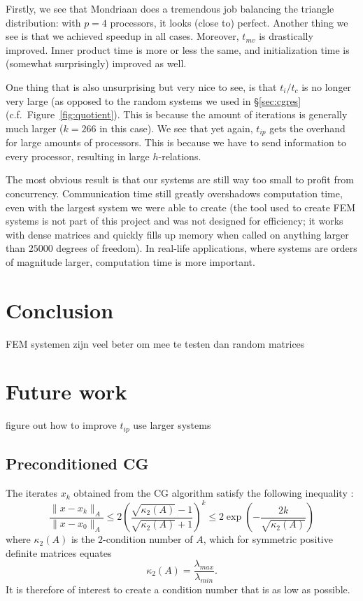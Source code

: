 \documentclass[11pt]{amsart}
\theoremstyle{definition}
\begin{document}
Firstly, we see that Mondriaan does a tremendous job balancing the triangle distribution: with $p=4$ processors, it looks (close to) perfect. Another thing we see is that we achieved speedup in all cases. Moreover, $t_{mv}$ is drastically improved. Inner product time is more or less the same, and initialization time is (somewhat surprisingly) improved as well.

One thing that is also unsurprising but very nice to see, is that $t_i/t_c$ is no longer very large (as opposed to the random systems we used in \S\ref{sec:cgres} (c.f.~Figure~\ref{fig:quotient}). This is because the amount of iterations is generally much larger ($k=266$ in this case). We see that yet again, $t_{ip}$ gets the overhand for large amounts of processors. This is because we have to send information to every processor, resulting in large $h$-relations.

The most obvious result is that our systems are still way too small to profit from concurrency. Communication time still greatly overshadows computation time, even with the largest system we were able to create (the tool used to create FEM systems is not part of this project and was not designed for efficiency; it works with dense matrices and quickly fills up memory when called on anything larger than $25000$ degrees of freedom). In real-life applications, where systems are orders of magnitude larger, computation time is more important.

\section{Conclusion}
FEM systemen zijn veel beter om mee te testen dan random matrices

\section{Future work}
figure out how to improve $t_{ip}$
use larger systems
\subsection{Preconditioned CG}
The iterates $x_k$ obtained from the CG algorithm satisfy the following inequality \cite[Lect.~7]{sleij}:
\[
  \frac{\|x - x_k\|_A}{\|x - x_0\|_A} \leq 2 \left( \frac{ \sqrt{\kappa_2(A)}-1}{\sqrt{\kappa_2(A)}+1}\right)^k \leq 2 \exp \left( -\frac{2k}{\sqrt{\kappa_2(A)}}\right) 
\]
where $\kappa_2(A)$ is the $2$-condition number of $A$, which for symmetric positive definite matrices equates
\[
  \kappa_2(A) = \frac{\lambda_{max}}{\lambda_{min}}.
\]
It is therefore of interest to create a condition number that is as low as possible.
\end{document}
